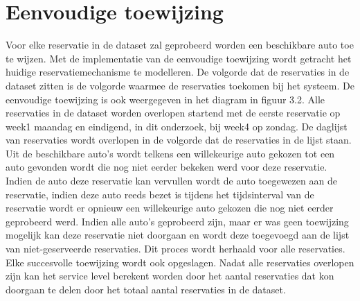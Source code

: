 \section{Eenvoudige toewijzing}
Voor elke reservatie in de dataset zal geprobeerd worden een beschikbare auto toe te wijzen. Met de implementatie van de eenvoudige toewijzing wordt getracht het huidige reservatiemechanisme te modelleren. De volgorde dat de reservaties in de dataset zitten is de volgorde waarmee de reservaties toekomen bij het systeem. De eenvoudige toewijzing is ook weergegeven in het diagram in figuur 3.2. Alle reservaties in de dataset worden overlopen startend met de eerste reservatie op week1 maandag en eindigend, in dit onderzoek, bij week4 op zondag. De daglijst van reservaties wordt overlopen in de volgorde dat de reservaties in de lijst staan. Uit de beschikbare auto's wordt telkens een willekeurige auto gekozen tot een auto gevonden wordt die nog niet eerder bekeken werd voor deze reservatie. Indien de auto deze reservatie kan vervullen wordt de auto toegewezen aan de reservatie, indien deze auto reeds bezet is tijdens het tijdsinterval van de reservatie wordt er opnieuw een willekeurige auto gekozen die nog niet eerder geprobeerd werd. Indien alle auto's geprobeerd zijn, maar er was geen toewijzing mogelijk kan deze reservatie niet doorgaan en wordt deze toegevoegd aan de lijst van niet-geserveerde reservaties. Dit proces wordt herhaald voor alle reservaties. Elke succesvolle toewijzing wordt ook opgeslagen. Nadat alle reservaties overlopen zijn kan het service level berekent worden door het aantal reservaties dat kon doorgaan te delen door het totaal aantal reservaties in de dataset. 

